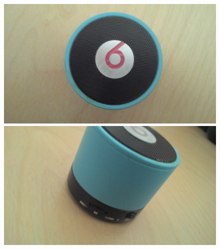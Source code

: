 \documentclass[a4paper,10pt]{article}
\begin{document}
\kopf
\renewcommand{\figurename}{Figure}


\begin{figure}[ht]
\centering \includegraphics[width=1\textwidth]{pic1.jpg}
\includegraphics[width=1\textwidth]{pic2.jpg}
\label{fig:wwu_logo}
\end{figure}
\end{document}
